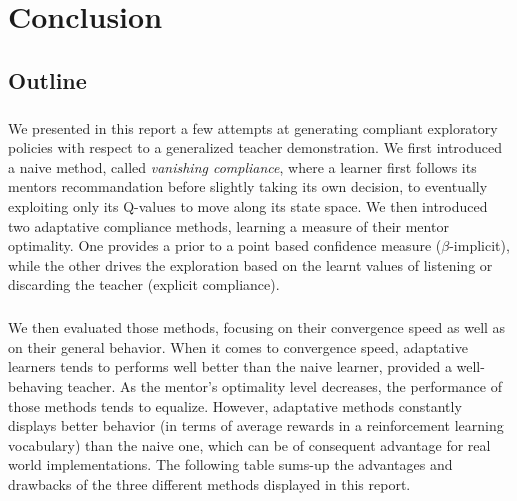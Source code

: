 \documentclass[a4paper]{report}
\begin{document}
{	\chapter*{Conclusion}
	{
		\section{Outline}
		{
			\paragraph{} We presented in this report a few attempts at generating compliant exploratory policies with respect to a generalized teacher demonstration. We first introduced a naive method, called \emph{vanishing compliance}, where a learner first follows its mentors recommandation before slightly taking its own decision, to eventually exploiting only its Q-values to move along its state space. We then introduced two adaptative compliance methods, learning a measure of their mentor optimality. One provides a prior to a point based confidence measure ($\beta$-implicit), while the other drives the exploration based on the learnt values of listening or discarding the teacher (explicit compliance).
			
			\paragraph{} We then evaluated those methods, focusing on their convergence speed as well as on their general behavior. When it comes to convergence speed, adaptative learners tends to performs well better than the naive learner, provided a well-behaving teacher. As the mentor's optimality level decreases, the performance of those methods tends to equalize. 
			\newline However, adaptative methods constantly displays better behavior (in terms of average rewards in a reinforcement learning vocabulary) than the naive one, which can be of consequent advantage for real world implementations. The following table sums-up the advantages and drawbacks of the three different methods displayed in this report. 
			
}}}
\end{document}

